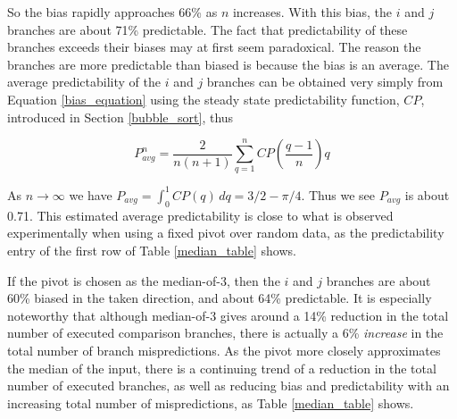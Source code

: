 \documentclass[acmtocl]{acmtrans2m}
\begin{document}
\noindent
So the bias rapidly approaches 66\% as $n$ increases. With this bias, the $i$ and $j$ branches are about 71\% predictable. 
The fact that predictability of these branches exceeds their biases
may at first seem paradoxical. The reason the branches are more predictable than biased is because the bias 
is an average. The average predictability of the $i$ and $j$ branches can be obtained very simply from
Equation \ref{bias_equation} using the steady state predictability function, $CP$, introduced in Section \ref{bubble_sort}, thus 

\[
P_{avg}^n = \frac{2}{n(n + 1)}\sum_{q = 1}^n CP\left( \frac{q - 1}{n} \right) q
\]

\noindent
As $n \rightarrow \infty$ we have $P_{avg} = \int_0^1 CP(q)\,dq = 3/2 - \pi/4$.
Thus we see $P_{avg}$ is about 0.71. This estimated average predictability is close to what is observed experimentally when using a fixed pivot
over random data, as the predictability entry of the first row of Table \ref{median_table} shows.

If the pivot is chosen as the median-of-3, then the $i$ and $j$ branches
are about 60\% biased in the taken direction, and about 64\% predictable. It is especially
noteworthy that although median-of-3 gives around a 14\% reduction in the total number of executed
comparison branches, there is actually a 6\% \textit{increase} in the total
number of branch mispredictions. As the pivot more closely approximates the median of the input,
there is a continuing trend of a reduction in the total number of executed branches, as well as reducing bias and predictability 
with an increasing total number of mispredictions, as Table \ref{median_table} shows.
\end{document}
